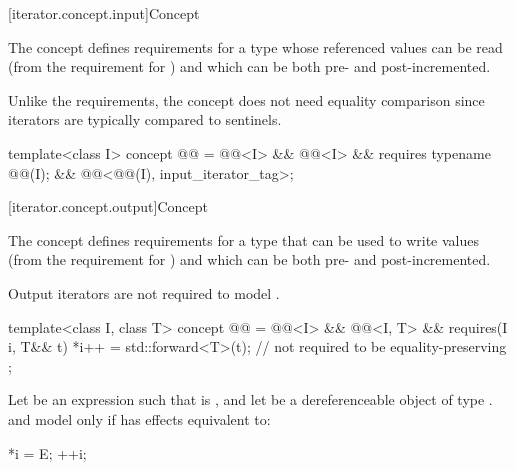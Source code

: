 [iterator.concept.input]{Concept }

\pnum
The  concept defines requirements for a type
whose referenced values can be read (from the requirement for
)
and which can be both pre- and post-incremented.
\begin{note}
Unlike the  requirements,
the  concept does not need
equality comparison since iterators are typically compared to sentinels.
\end{note}

\begin{codeblock}
template<class I>
  concept @@ =
    @@<I> &&
    @@<I> &&
    requires { typename @@(I); } &&
    @@<@@(I), input_iterator_tag>;
\end{codeblock}

[iterator.concept.output]{Concept }

\pnum
The  concept defines requirements for a type that
can be used to write values (from the requirement for
)
and which can be both pre- and post-incremented.
\begin{note}
Output iterators are not required to model .
\end{note}

\begin{codeblock}
template<class I, class T>
  concept @@ =
    @@<I> &&
    @@<I, T> &&
    requires(I i, T&& t) {
      *i++ = std::forward<T>(t);        // not required to be equality-preserving
    };
\end{codeblock}

\pnum
Let  be an expression such that  is , and let  be a
dereferenceable object of type .  and  model  only if
 has effects equivalent to:
\begin{codeblock}
*i = E;
++i;
\end{codeblock}

